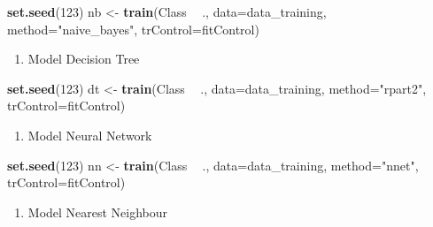 \documentclass[]{article}
\newenvironment{Shaded}{\begin{snugshade}}{\end{snugshade}}
\newcommand{\DataTypeTok}[1]{\textcolor[rgb]{0.13,0.29,0.53}{#1}}
\newcommand{\DecValTok}[1]{\textcolor[rgb]{0.00,0.00,0.81}{#1}}
\newcommand{\KeywordTok}[1]{\textcolor[rgb]{0.13,0.29,0.53}{\textbf{#1}}}
\newcommand{\NormalTok}[1]{#1}
\newcommand{\OperatorTok}[1]{\textcolor[rgb]{0.81,0.36,0.00}{\textbf{#1}}}
\newcommand{\StringTok}[1]{\textcolor[rgb]{0.31,0.60,0.02}{#1}}
\providecommand{\tightlist}{%
  \setlength{\itemsep}{0pt}\setlength{\parskip}{0pt}}
\begin{document}
\begin{Shaded}
	\begin{Highlighting}[]
\KeywordTok{set.seed}\NormalTok{(}\DecValTok{123}\NormalTok{)}
\NormalTok{nb <-}\StringTok{ }\KeywordTok{train}\NormalTok{(Class }\OperatorTok{~}\StringTok{ }\NormalTok{., }
	\DataTypeTok{data=}\NormalTok{data_training, }
	\DataTypeTok{method=}\StringTok{"naive_bayes"}\NormalTok{,}
	\DataTypeTok{trControl=}\NormalTok{fitControl)}
	\end{Highlighting}
\end{Shaded}

\begin{enumerate}
	\def\labelenumi{\arabic{enumi}.}
	\setcounter{enumi}{1}
	\tightlist
	\item
	Model Decision Tree
\end{enumerate}

\begin{Shaded}
	\begin{Highlighting}[]
\KeywordTok{set.seed}\NormalTok{(}\DecValTok{123}\NormalTok{)}
\NormalTok{dt <-}\StringTok{ }\KeywordTok{train}\NormalTok{(Class }\OperatorTok{~}\StringTok{ }\NormalTok{., }
	\DataTypeTok{data=}\NormalTok{data_training, }
	\DataTypeTok{method=}\StringTok{"rpart2"}\NormalTok{,}
	\DataTypeTok{trControl=}\NormalTok{fitControl)}
	\end{Highlighting}
\end{Shaded}

\begin{enumerate}
	\def\labelenumi{\arabic{enumi}.}
	\setcounter{enumi}{2}
	\tightlist
	\item
	Model Neural Network
\end{enumerate}

\begin{Shaded}
	\begin{Highlighting}[]
\KeywordTok{set.seed}\NormalTok{(}\DecValTok{123}\NormalTok{)}
\NormalTok{nn <-}\StringTok{ }\KeywordTok{train}\NormalTok{(Class }\OperatorTok{~}\StringTok{ }\NormalTok{., }
	\DataTypeTok{data=}\NormalTok{data_training, }
	\DataTypeTok{method=}\StringTok{"nnet"}\NormalTok{,}
	\DataTypeTok{trControl=}\NormalTok{fitControl)}
	\end{Highlighting}
\end{Shaded}

\begin{enumerate}
	\def\labelenumi{\arabic{enumi}.}
	\setcounter{enumi}{3}
	\tightlist
	\item
	Model Nearest Neighbour
\end{enumerate}
\end{document}
